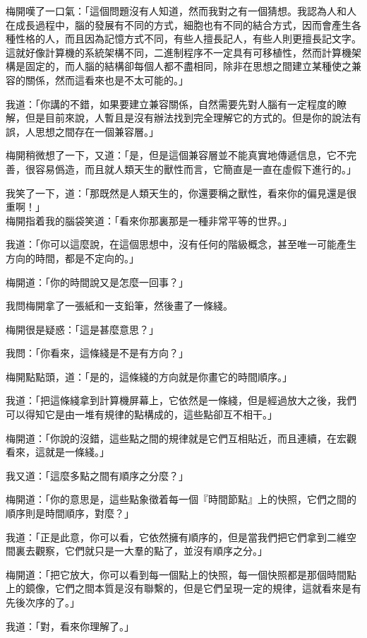 梅開嘆了一口氣：「這個問題沒有人知道，然而我對之有一個猜想。我認為人和人在成長過程中，腦的發展有不同的方式，細胞也有不同的結合方式，因而會產生各種性格的人，而且因為記憶方式不同，有些人擅長記人，有些人則更擅長記文字。這就好像計算機的系統架構不同，二進制程序不一定具有可移植性，然而計算機架構是固定的，而人腦的結構卻每個人都不盡相同，除非在思想之間建立某種使之兼容的關係，然而這看來也是不太可能的。」

我道：「你講的不錯，如果要建立兼容關係，自然需要先對人腦有一定程度的瞭解，但是目前來說，人暫且是沒有辦法找到完全理解它的方式的。但是你的說法有誤，人思想之間存在一個兼容層。」

梅開稍微想了一下，又道：「是，但是這個兼容層並不能真實地傳遞信息，它不完善，很容易僞造，而且就人類天生的獸性而言，它簡直是一直在虛假下進行的。」

我笑了一下，道：「那既然是人類天生的，你還要稱之獸性，看來你的偏見還是很重啊！」
\\


梅開指着我的腦袋笑道：「看來你那裏那是一種非常平等的世界。」

我道：「你可以這麼說，在這個思想中，沒有任何的階級概念，甚至唯一可能產生方向的時間，都是不定向的。」

梅開道：「你的時間說又是怎麼一回事？」

我問梅開拿了一張紙和一支鉛筆，然後畫了一條綫。

梅開很是疑惑：「這是甚麼意思？」

我問：「你看來，這條綫是不是有方向？」

梅開點點頭，道：「是的，這條綫的方向就是你畫它的時間順序。」

我道：「把這條綫拿到計算機屏幕上，它依然是一條綫，但是經過放大之後，我們可以得知它是由一堆有規律的點構成的，這些點卻互不相干。」

梅開道：「你說的沒錯，這些點之間的規律就是它們互相貼近，而且連續，在宏觀看來，這就是一條綫。」

我又道：「這麼多點之間有順序之分麼？」

梅開道：「你的意思是，這些點象徵着每一個『時間節點』上的快照，它們之間的順序則是時間順序，對麼？」

我道：「正是此意，你可以看，它依然擁有順序的，但是當我們把它們拿到二維空間裏去觀察，它們就只是一大羣的點了，並沒有順序之分。」

梅開道：「把它放大，你可以看到每一個點上的快照，每一個快照都是那個時間點上的鏡像，它們之間本質是沒有聯繫的，但是它們呈現一定的規律，這就看來是有先後次序的了。」

我道：「對，看來你理解了。」

